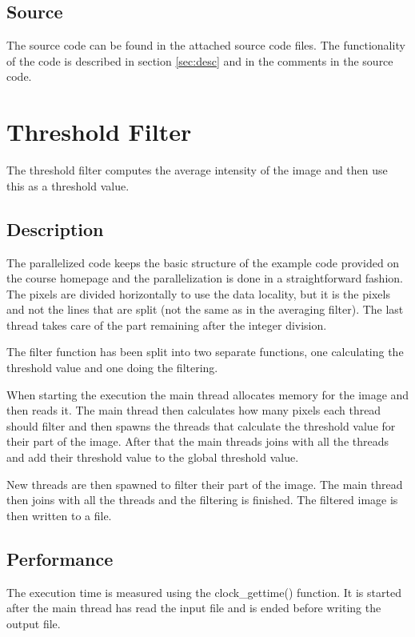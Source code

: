 \documentclass[a4paper, 12pt]{article}
\begin{document}
\subsection{Source}

The source code can be found in the attached source code files.
The functionality of the code is described in section \ref{sec:desc} and in the
comments in the source code.


\section{Threshold Filter}
The threshold filter computes the average intensity of the image and then use
this as a threshold value.


\subsection{Description}
\label{sec:desc2}
The parallelized code keeps the basic structure of the example code provided on
the course homepage and the parallelization is done in a straightforward
fashion. The pixels are divided horizontally to use the data locality, but it is
the pixels and not the lines that are split (not the same as in the averaging
filter). The last thread takes care of the part remaining after the integer
division.

The filter function has been split into two separate functions, one calculating
the threshold value and one doing the filtering.

When starting the execution the main thread allocates memory for the image and
then reads it. The main thread then calculates how many pixels each thread
should filter and then spawns the threads that calculate the threshold value for
their part of the image. After that the main threads joins with all the threads
and add their threshold value to the global threshold value.

New threads are then spawned to filter their part of the image. The main thread
then joins with all the threads and the filtering is finished. The filtered
image is then written to a file.

\subsection{Performance}

The execution time is measured using the clock\_gettime() function. It is
started after the main thread has read the input file and is ended before
writing the output file.
\end{document}
